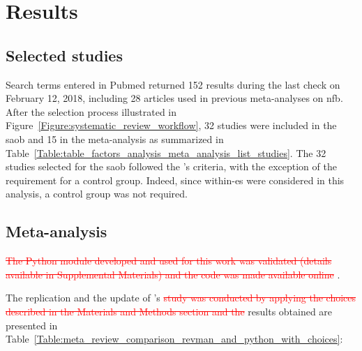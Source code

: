 


\section{Results}

\subsection{Selected studies}

Search terms entered in Pubmed returned 152 results during the last check on February 12, 2018, including 28 
articles used in previous meta-analyses on \gls{nfb}. After the selection process illustrated 
in Figure~\ref{Figure:systematic_review_workflow}, 32 studies were included in the \gls{saob} and 15 in the meta-analysis 
as summarized in Table~\ref{Table:table_factors_analysis_meta_analysis_list_studies}. The 32 studies selected for the \gls{saob} 
followed the \citeauthor{Cortese2016}'s criteria, with the exception of the requirement for a control group. 
Indeed, since within-\gls{es} were considered in this analysis, a control group was not required.

\subsection{Meta-analysis}

\textcolor{red}{\sout{The Python module developed and used for this work was validated (details available in Supplemental Materials) 
and the code was made available online}} \citep{Bussalb2018}.

The replication and the update of \citeauthor{Cortese2016}'s \textcolor{red}{\sout{study was conducted by applying the choices described 
in the Materials and Methods section and the}} results obtained are presented 
in Table~\ref{Table:meta_review_comparison_revman_and_python_with_choices}:

